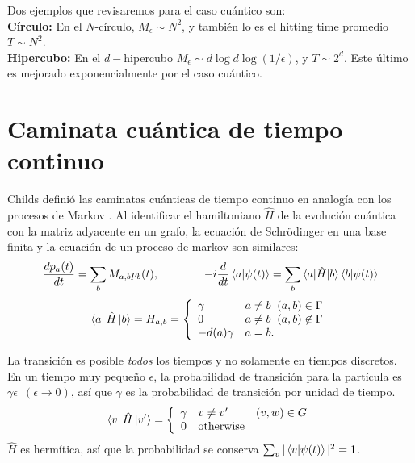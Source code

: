 Dos ejemplos que revisaremos para el caso cuántico son:\\

\textbf{Círculo:} En el $N$-círculo, $M_\epsilon\sim N^2$, y también lo es el hitting time promedio $T\sim N^2$.\\

\textbf{Hipercubo:} En el $d-$hipercubo $M_\epsilon\sim d\log d\log (1/\epsilon)$, y 
$T\sim 2^d$. Este último es mejorado exponencialmente por el caso cuántico.

\section{Caminata cuántica de tiempo continuo}
Childs definió las caminatas cuánticas de tiempo continuo en analogía con los procesos de Markov \cite{childs2002example}. Al identificar el hamiltoniano $\hat{H}$ de la evolución cuántica con la matriz adyacente en un grafo, la ecuación de Schrödinger en una base finita y la ecuación de un proceso de markov son similares:
\begin{equation}
\frac{dp_a(t)}{dt}=\sum_bM_{a,b}p_b(t),\qquad \qquad    
-i\frac{d}{dt}\braket{a|\psi(t)}=\sum_b\braket{a|\hat{H}|b}\braket{b|\psi(t)}
\end{equation}{}
\begin{equation}
    \bra{a}\hat{H}\ket{b}=H_{a,b}=
    \left\{
    \begin{array}{ll}
    \gamma  &  a\neq b \;\; (a,b)\in \Gamma \\
    0   & a\neq b  \;\; (a,b) \not\in \Gamma  \\
    -d(a)\gamma & a=b.     
    \end{array}
    \right.
\end{equation}{}

La transición es posible \textit{todos} los tiempos y no solamente en tiempos discretos. En un tiempo muy pequeño $\epsilon$, la probabilidad de transición para la partícula es $\gamma \epsilon\,\,\,(\epsilon\xrightarrow{}0)$, así que $\gamma$ es la probabilidad de transición por unidad de tiempo. 
\begin{equation*}
    \bra{v}\hat{H}\ket{v'}=
    \left\{
    \begin{array}{cll}
    \gamma  &  v\neq v' & (v,w)\in G  \\
    0 & \text{otherwise}  & \end{array}
    \right.
\end{equation*}{}
$\hat{H}$ es hermítica, así que la probabilidad se conserva $\sum_v |\braket{v|\psi(t)}|^2=1$.